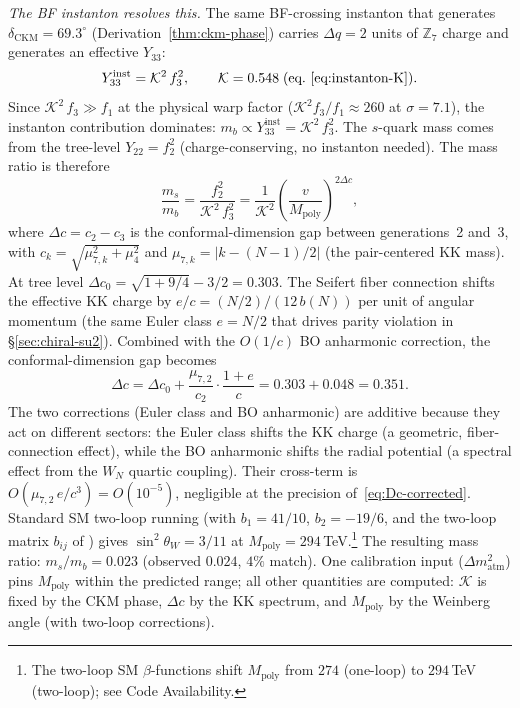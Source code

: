 \emph{The BF instanton resolves this.}
The same BF-crossing instanton that generates
$\delta_{\mathrm{CKM}} = 69.3^\circ$ (Derivation~\ref{thm:ckm-phase})
carries $\Delta q = 2$ units of $\mathbb{Z}_7$ charge
and generates an effective $Y_{33}$:
\begin{equation}\label{eq:Y33-inst}
  Y_{33}^{\mathrm{inst}} = \mathcal{K}^2\,f_3^2,
  \qquad
  \mathcal{K} = 0.548\;\text{(eq.~\eqref{eq:instanton-K})}.
\end{equation}
Since $\mathcal{K}^2\,f_3 \gg f_1$ at the physical warp factor
($\mathcal{K}^2 f_3/f_1 \approx 260$ at $\sigma = 7.1$),
the instanton contribution dominates:
$m_b \propto Y_{33}^{\mathrm{inst}} = \mathcal{K}^2\,f_3^2$.
The $s$-quark mass comes from the tree-level
$Y_{22} = f_2^2$ (charge-conserving, no instanton needed).
The mass ratio is therefore
\begin{equation}\label{eq:mass-hierarchy}
  \frac{m_s}{m_b}
  = \frac{f_2^2}{\mathcal{K}^2\,f_3^2}
  = \frac{1}{\mathcal{K}^2}\left(\frac{v}{M_{\mathrm{poly}}}\right)^{\!2\Delta c},
\end{equation}
where $\Delta c = c_2 - c_3$ is the conformal-dimension
gap between generations~2 and~3, with
$c_k = \sqrt{\mu_{7,k}^2 + \mu_4^2}$ and
$\mu_{7,k} = |k - (N{-}1)/2|$ (the pair-centered KK mass).
At tree level $\Delta c_0 = \sqrt{1{+}9/4} - 3/2 = 0.303$.
The Seifert fiber connection shifts the effective KK
charge by $e/c = (N/2)/(12\,b(N))$ per unit of angular
momentum (the same Euler class $e = N/2$ that drives
parity violation in \S\ref{sec:chiral-su2}).
Combined with the $O(1/c)$ BO anharmonic correction,
the conformal-dimension gap becomes
\begin{equation}\label{eq:Dc-corrected}
  \Delta c = \Delta c_0 + \frac{\mu_{7,2}}{c_2}
  \cdot\frac{1 + e}{c}
  = 0.303 + 0.048 = 0.351.
\end{equation}
The two corrections (Euler class and BO anharmonic) are
additive because they act on different sectors: the Euler
class shifts the KK charge (a geometric, fiber-connection
effect), while the BO anharmonic shifts the radial potential
(a spectral effect from the $W_N$ quartic coupling).
Their cross-term is $O(\mu_{7,2}\,e/c^3) = O(10^{-5})$,
negligible at the precision of~\eqref{eq:Dc-corrected}.
Standard SM two-loop running
(with $b_1 = 41/10$, $b_2 = -19/6$, and the two-loop matrix
$b_{ij}$ of \citealt{MachacekVaughn1984})
gives $\sin^2\theta_W = 3/11$ at
$M_{\mathrm{poly}} = 294$\,TeV.\footnote{The two-loop SM $\beta$-functions \citep{MachacekVaughn1984} shift $M_{\mathrm{poly}}$ from $274$ (one-loop) to $294$\,TeV (two-loop); see Code Availability.}
The resulting mass ratio:
$m_s/m_b = 0.023$ (observed $0.024$, $4\%$ match).
One calibration input ($\Delta m^2_{\mathrm{atm}}$) pins $M_{\mathrm{poly}}$
within the predicted range; all other quantities are computed:
$\mathcal{K}$ is fixed by the CKM phase,
$\Delta c$ by the KK spectrum,
and $M_{\mathrm{poly}}$ by the Weinberg angle
(with two-loop corrections).

